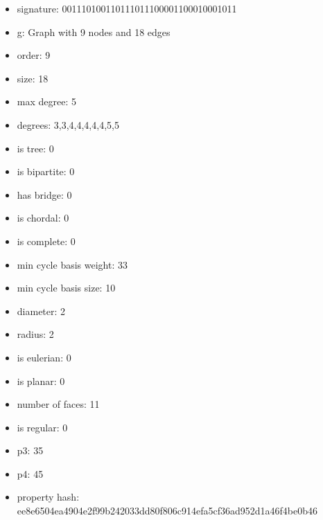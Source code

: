 \newpage
\begin{figure}
\end{figure}
\begin{itemize}
\item signature: 001110100110111011100001100010001011
\item g: Graph with 9 nodes and 18 edges
\item order: 9
\item size: 18
\item max degree: 5
\item degrees: 3,3,4,4,4,4,4,5,5
\item is tree: 0
\item is bipartite: 0
\item has bridge: 0
\item is chordal: 0
\item is complete: 0
\item min cycle basis weight: 33
\item min cycle basis size: 10
\item diameter: 2
\item radius: 2
\item is eulerian: 0
\item is planar: 0
\item number of faces: 11
\item is regular: 0
\item p3: 35
\item p4: 45
\item property hash: ee8e6504ea4904e2f99b242033dd80f806c914efa5cf36ad952d1a46f4be0b46
\end{itemize}
